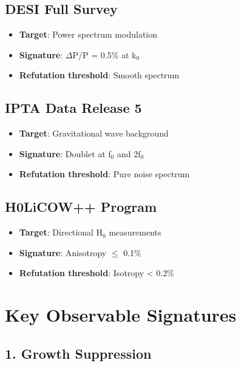 \documentclass[
  11pt,
]{report}
\providecommand{\tightlist}{%
  \setlength{\itemsep}{0pt}\setlength{\parskip}{0pt}}
\begin{document}
\subsection{DESI Full Survey}\label{desi-full-survey}

\begin{itemize}
\tightlist
\item
  \textbf{Target}: Power spectrum modulation
\item
  \textbf{Signature}: \(\Delta\)P/P = 0.5\% at k\(_0\)
\item
  \textbf{Refutation threshold}: Smooth spectrum
\end{itemize}

\subsection{IPTA Data Release 5}\label{ipta-data-release-5}

\begin{itemize}
\tightlist
\item
  \textbf{Target}: Gravitational wave background
\item
  \textbf{Signature}: Doublet at f\(_0\) and 2f\(_0\)
\item
  \textbf{Refutation threshold}: Pure noise spectrum
\end{itemize}

\subsection{H0LiCOW++ Program}\label{h0licow-program}

\begin{itemize}
\tightlist
\item
  \textbf{Target}: Directional H\(_0\) measurements
\item
  \textbf{Signature}: Anisotropy \(\leq\) 0.1\%
\item
  \textbf{Refutation threshold}: Isotropy \textless{} 0.2\%
\end{itemize}

\section{Key Observable Signatures}\label{key-observable-signatures}

\subsection{1. Growth Suppression}\label{growth-suppression}
\end{document}

